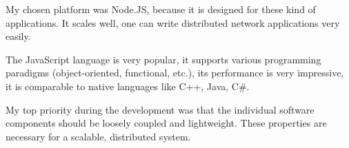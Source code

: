My chosen platform was Node.JS, because it is designed for these kind of
applications. It scales well, one can write distributed network applications
very easily.

The JavaScript language is very popular, it supports various programming
paradigms (object-oriented, functional, etc.), its performance is very
impressive, it is comparable to native languages like C++, Java, C\#.

My top priority during the development was that the individual software
components should be loosely coupled and lightweight. These properties
are necessary for a scalable, distributed system.

\vfill

